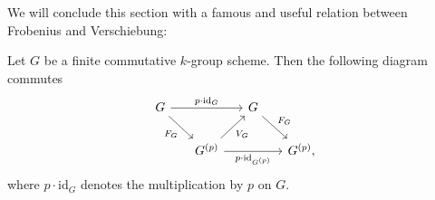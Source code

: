 \noindent
We will conclude this section with a famous and useful relation between
Frobenius and Verschiebung:
\begin{thm}\label{thm:FrobeniusVerschiebungRelation}
	Let $G$ be a finite commutative $k$-group scheme. Then the following
	diagram commutes
	\begin{equation}
	\begin{tikzcd}[column sep=1.5em]
		G \arrow[rr, "p \cdot \mathrm{id}_{ G }", rightarrow] 
		\arrow[rd, "F_G"', rightarrow] & &
		G \arrow[rd, "F_G", rightarrow] & \\
		&
		G^{(p)} \arrow[ru, "V_G"', rightarrow] 
		\arrow[rr, "p \cdot \mathrm{id}_{ G^{(p)} }"', rightarrow] & &
		G^{(p)}
	,\end{tikzcd}
	\end{equation}
	where $p \cdot \mathrm{id}_{ G }$ denotes the multiplication by $p$
	on $G$.
\end{thm}


